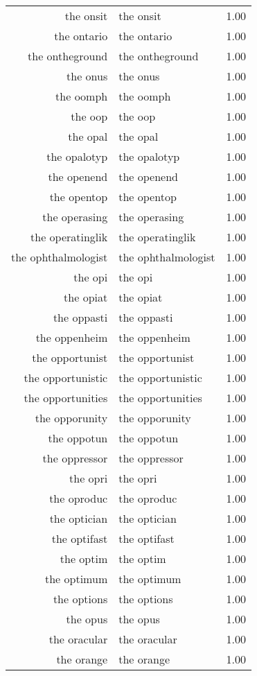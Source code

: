 \begin{table}[ht]
\begin{tabular}{rlr}
  the onsit & the onsit & 1.00 \\ 
  the ontario & the ontario & 1.00 \\ 
  the ontheground & the ontheground & 1.00 \\ 
  the onus & the onus & 1.00 \\ 
  the oomph & the oomph & 1.00 \\ 
  the oop & the oop & 1.00 \\ 
  the opal & the opal & 1.00 \\ 
  the opalotyp & the opalotyp & 1.00 \\ 
  the openend & the openend & 1.00 \\ 
  the opentop & the opentop & 1.00 \\ 
  the operasing & the operasing & 1.00 \\ 
  the operatinglik & the operatinglik & 1.00 \\ 
  the ophthalmologist & the ophthalmologist & 1.00 \\ 
  the opi & the opi & 1.00 \\ 
  the opiat & the opiat & 1.00 \\ 
  the oppasti & the oppasti & 1.00 \\ 
  the oppenheim & the oppenheim & 1.00 \\ 
  the opportunist & the opportunist & 1.00 \\ 
  the opportunistic & the opportunistic & 1.00 \\ 
  the opportunities & the opportunities & 1.00 \\ 
  the opporunity & the opporunity & 1.00 \\ 
  the oppotun & the oppotun & 1.00 \\ 
  the oppressor & the oppressor & 1.00 \\ 
  the opri & the opri & 1.00 \\ 
  the oproduc & the oproduc & 1.00 \\ 
  the optician & the optician & 1.00 \\ 
  the optifast & the optifast & 1.00 \\ 
  the optim & the optim & 1.00 \\ 
  the optimum & the optimum & 1.00 \\ 
  the options & the options & 1.00 \\ 
  the opus & the opus & 1.00 \\ 
  the oracular & the oracular & 1.00 \\ 
  the orange & the orange & 1.00 \\ 

\end{tabular}
\end{table}
